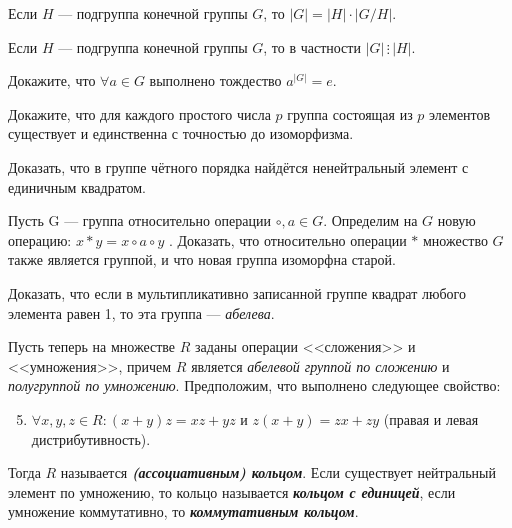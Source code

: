 \documentclass{article}
\begin{document}
\begin{theorem_boxed}[ (Лагранж)]
	Если $H$ — подгруппа конечной группы $G$, то $|G| = |H| \cdot |G/H|$.
\end{theorem_boxed}


\begin{example}
	Если $H$ — подгруппа конечной группы $G$, то в частности $|G| \,\vdots\, |H|$.
\end{example}


\begin{task_boxed}
	Докажите, что $\forall a \in G$ выполнено тождество $a^{|G|} = e.$
\end{task_boxed}


\begin{task_boxed}
	Докажите, что для каждого простого числа $p$ группа состоящая из $p$ элементов существует и единственна с точностью до изоморфизма.
\end{task_boxed}

\begin{task_boxed}
	Доказать, что в группе чётного порядка найдётся ненейтральный элемент с единичным квадратом.
\end{task_boxed}

\begin{task_boxed}
	Пусть G — группа относительно операции $\circ, a \in G$. Определим на $ G $ новую операцию: $ x \ast y = x \circ a \circ y $ . Доказать, что относительно операции $\ast$ множество $G$ также является группой, и что новая группа изоморфна старой.
\end{task_boxed}
\begin{task_boxed}[ *]
	Доказать, что если в мультипликативно записанной группе квадрат любого элемента равен 1, то эта группа — \textit{абелева}.
\end{task_boxed}


\begin{definition_boxed}
	Пусть теперь на множестве $R$ заданы операции <<сложения>> и <<умножения>>, причем $R$ является \textit{абелевой группой по сложению} и \textit{полугруппой по умножению}. Предположим, что выполнено следующее свойство:
	\begin{enumerate}[label*=\textbf{(\arabic{enumi})}]
		\setcounter{enumi}{4}
		
		\item $\forall x, y, z \in R : (x + y)z = xz + yz$ и $z(x + y) = zx + zy$ (правая и левая дистрибутивность).
	\end{enumerate}
	Тогда $R$ называется \textbf{\textit{(ассоциативным) кольцом}}.
	Если существует нейтральный элемент по умножению, то кольцо называется \textbf{\textit{кольцом с единицей}}, если умножение коммутативно, то \textbf{\textit{коммутативным кольцом}}.
\end{definition_boxed}
\end{document}
